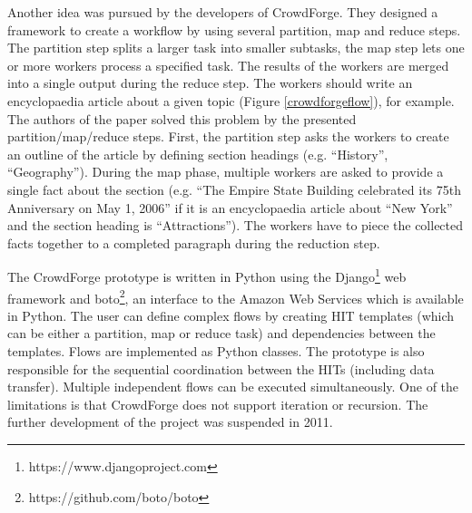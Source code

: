 Another idea was pursued by the developers of CrowdForge\cite{crowdforge}. They designed a framework to create a workflow by using several partition, map and reduce steps. The partition step splits a larger task into smaller subtasks, the map step lets one or more workers process a specified task. The results of the workers are merged into a single output during the reduce step. The workers should write an encyclopaedia article about a given topic (Figure \ref{crowdforgeflow}), for example. The authors of the paper solved this problem by the presented partition/map/reduce steps. First, the partition step asks the workers to create an outline of the article by defining section headings (e.g. ``History'', ``Geography''). During the map phase, multiple workers are asked to provide a single fact about the section (e.g. ``The Empire State Building celebrated its 75th Anniversary on May 1, 2006'' if it is an encyclopaedia article about ``New York'' and the section heading is ``Attractions''). The workers have to piece the collected facts together to a completed paragraph during the reduction step.

The CrowdForge prototype is written in Python using the Django\footnote{https://www.djangoproject.com} web framework and boto\footnote{https://github.com/boto/boto}, an interface to the Amazon Web Services which is available in Python. The user can define complex flows by creating HIT templates (which can be either a partition, map or reduce task) and dependencies between the templates. Flows are implemented as Python classes. The prototype is also responsible for the sequential coordination between the HITs (including data transfer). Multiple independent flows can be executed simultaneously. One of the limitations is that CrowdForge does not support iteration or recursion. The further development of the project was suspended in 2011.

